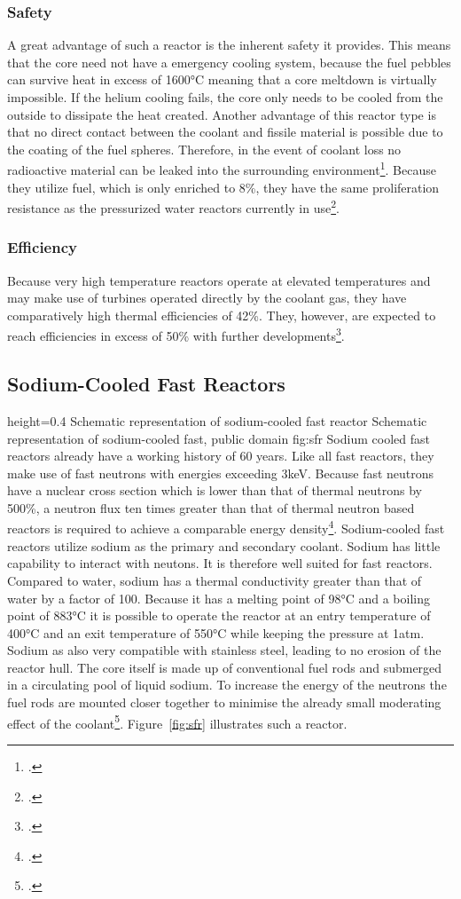 \subsubsection{Safety}
A great advantage of such a reactor is the inherent safety it provides. This means that the core
need not have a emergency cooling system, because the fuel pebbles can survive heat in excess of 1600°C
meaning that a core meltdown is virtually impossible. If the helium cooling fails, the core only needs to
be cooled from the outside to dissipate the heat created. Another advantage of this reactor type is that
no direct contact between the coolant and fissile material is possible due to the coating of the fuel
spheres. Therefore, in the event of coolant loss no radioactive material can be leaked
into the surrounding environment\footcite[18-21]{VHTRTS}.
Because they utilize fuel, which is only enriched to 8\%, they have the same proliferation resistance
as the pressurized water reactors currently in use\footcite{VHTRTS}.
\subsubsection{Efficiency}
Because very high temperature reactors operate at elevated temperatures and may make use of turbines
operated directly by the coolant gas, they have comparatively high thermal efficiencies of 42\%.
They, however, are expected to reach efficiencies in excess of 50\% with further developments\footcite[62]{T4Gen}.
\pagebreak
\subsection{Sodium-Cooled Fast Reactors}\label{chap:sfr}
    {height=0.4\textheight}
    {Schematic representation of sodium-cooled fast reactor}
    {Schematic representation of sodium-cooled fast, public domain}
    {fig:sfr}
Sodium cooled fast reactors already have a working history of 60 years. Like all fast reactors, they make
use of fast neutrons with energies exceeding 3keV. Because fast neutrons have a nuclear cross section which is lower than that
of thermal neutrons by 500\%, a neutron flux ten times greater than that of thermal neutron based reactors
is required to achieve a comparable energy density\footcite[120-122]{ReactorPhysics}.
Sodium-cooled fast reactors utilize sodium as the primary and secondary coolant. Sodium has little
capability to interact with neutons. It is therefore well suited for fast reactors. Compared
to water, sodium has a thermal conductivity greater than that of water by a factor of 100. Because
it has a melting point of 98°C and a boiling point of 883°C it is possible to operate the reactor at an
entry temperature of 400°C and an exit temperature of 550°C while keeping the pressure at 1atm. Sodium
as also very compatible with stainless steel, leading to no erosion of the reactor hull. The core
itself is made up of conventional fuel rods and submerged in a circulating pool of liquid sodium.
To increase the energy of the neutrons the fuel rods are mounted closer together to minimise the
already small moderating effect of the coolant\footcite[94-110]{T4Gen}. Figure~\ref{fig:sfr} illustrates
such a reactor.
